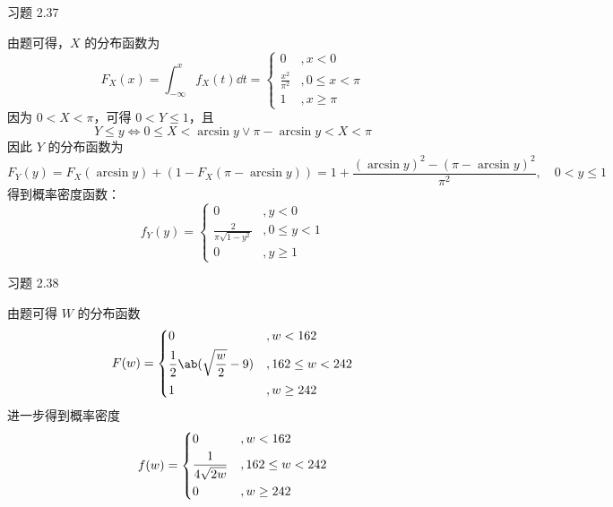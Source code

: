 \begin{problem}
    习题 2.37
    \begin{solution}
        由题可得，$X$ 的分布函数为
        $$
        F_X(x) = \int_{-\infty}^{x} f_X(t) \dd{t} = \begin{cases}
            0 &, x < 0 \\
            \frac{x^2}{\pi^2} &, 0 \le x < \pi \\
            1 &, x \ge \pi
        \end{cases}
        $$
        因为 $0 < X < \pi$，可得 $0 < Y \le 1$，且
        $$
        Y \le y \iff 0 \le X < \arcsin y \lor \pi - \arcsin y < X < \pi
        $$
        因此 $Y$ 的分布函数为
        $$
        F_Y(y) = F_X(\arcsin y) + (1 - F_X(\pi - \arcsin y)) = 1 + \frac{(\arcsin y)^2 - (\pi - \arcsin y)^2}{\pi^2}, \quad 0 < y \le 1
        $$
        得到概率密度函数：
        $$
        f_Y(y) = \begin{cases}
            0 &, y < 0 \\
            \frac{2}{\pi \sqrt{1 - y^2}} &, 0 \le y < 1 \\
            0 &, y \ge 1
        \end{cases}
        $$
    \end{solution}
\end{problem}

\begin{problem}
    习题 2.38
    \begin{solution}
        由题可得 $W$ 的分布函数
        $$
        F(w) = \begin{dcases}
            0 &, w < 162 \\
            \frac{1}{2} \ab(\sqrt{\frac{w}{2}} - 9) &, 162 \le w < 242 \\
            1 &, w \ge 242
        \end{dcases}
        $$
        进一步得到概率密度
        $$
        f(w) = \begin{dcases}
            0 &, w < 162 \\
            \frac{1}{4 \sqrt{2 w}} &, 162 \le w < 242 \\
            0 &, w \ge 242
        \end{dcases}
        $$
    \end{solution}
\end{problem}
